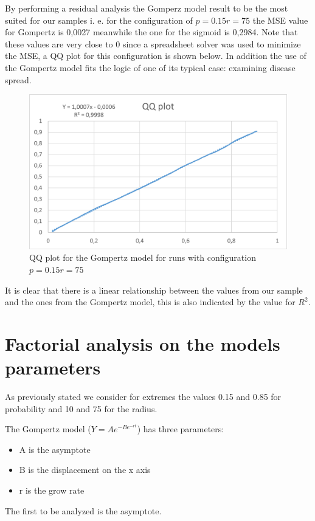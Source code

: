 By performing a residual analysis the Gomperz model result to be the most suited for our samples i. e. for the configuration of $p=0.15 r=75$ the MSE value for Gompertz is 0,0027 meanwhile the one for the sigmoid is 0,2984. Note that these values are very close to 0 since a spreadsheet solver was used to minimize the MSE, a QQ plot for this configuration is shown below. In addition the use of the Gompertz model fits the logic of one of its typical case: examining disease spread.

\begin{figure}[H]
\centering
    \includegraphics[width= 1\textwidth]{./images/QQPlot200.png}
    \caption{QQ plot for the Gompertz model for runs with configuration $p=0.15 r=75$}
\end{figure}

It is clear that there is a linear relationship between the values from our sample and the ones from the Gompertz model, this is also indicated by the value for $R^2$.

\section{Factorial analysis on the models parameters}
As previously stated we consider for extremes the values 0.15 and 0.85 for probability and 10 and 75 for the radius.

The Gompertz model ($ Y = Ae^{-Be^{-rt}} $) has three parameters:
\begin{itemize}
	\item A is the asymptote
	\item B is the displacement on the x axis
	\item r is the grow rate
\end{itemize}
The first to be analyzed is the asymptote.

